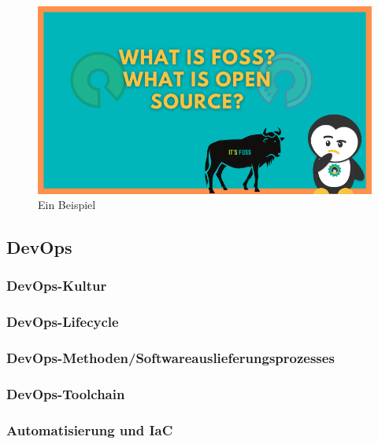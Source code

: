 \documentclass[12pt,titlepage]{article}
\begin{document}
\begin{figure}[h]
    \centering
    \includegraphics[scale=0.7]{Bilder/what-is-foss}
    \caption{Ein Beispiel}
\end{figure}

\subsection{DevOps}



\subsubsection{DevOps-Kultur}



\subsubsection{DevOps-Lifecycle}



\subsubsection{DevOps-Methoden/Softwareauslieferungsprozesses}



\subsubsection{DevOps-Toolchain}



\subsubsection{Automatisierung und IaC}
\end{document}
